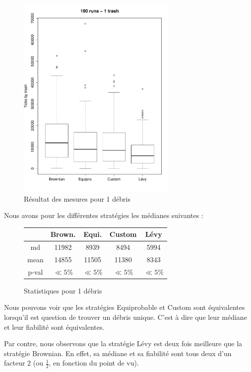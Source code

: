 

\begin{figure}[H]
	\begin{center}
		\includegraphics[height=10cm]{diagrams/1Tr_all.pdf}
		\caption{Résultat des mesures pour 1 débris}
		\label{fig:1Trash}
	\end{center}
\end{figure}


Nous avons pour les différentes stratégies les médianes suivantes :

\begin{figure}[H]
	\begin{center}
		\begin{tabular}{| c || c | c | c | c | }
			\hline
			&Brown.&Equi.&Custom&Lévy \\
			\hline
			\hline
			md&11982&8939&8494&5994\\
			mean&14855&11505&11380&8343\\
			p-val&$\ll 5\%$&$\ll 5\%$&$\ll 5\%$&$\ll 5\%$\\
			\hline
		\end{tabular}
		\caption{{Statistiques pour 1 débris}}
	\end{center}
\end{figure}


Nous pouvons voir que les stratégies Equiprobable et Custom sont
équivalentes lorsqu'il est question de trouver un débris unique.
C'est à dire que leur médiane et leur fiabilité sont équivalentes.

Par contre, nous observons que la stratégie Lévy est deux fois
meilleure que la stratégie Brownian. En effet, sa médiane et sa
fiabilité sont tous deux d'un facteur 2 (ou $\frac{1}{2}$, en fonction du
point de vu).


